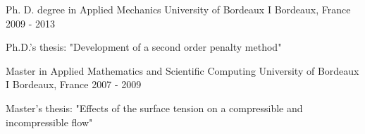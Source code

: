 

\begin{cventries}

  \cventry
    {Ph. D. degree in Applied Mechanics} %
    {University of Bordeaux I} %
    {Bordeaux, France} %
    {2009 - 2013} %
    {
      \begin{cvitems} %
        \item {Ph.D.'s thesis: "Development of a second order penalty method"}
      \end{cvitems}
    }
    
  \cventry
    {Master in Applied Mathematics and Scientific Computing} %
    {University of Bordeaux I} %
    {
      Bordeaux, France} %
    {2007 - 2009} %
    {
      \begin{cvitems} %
        \item {Master's thesis: "Effects of the surface tension on a compressible and incompressible flow"}
      \end{cvitems}
    }
    
\end{cventries}
